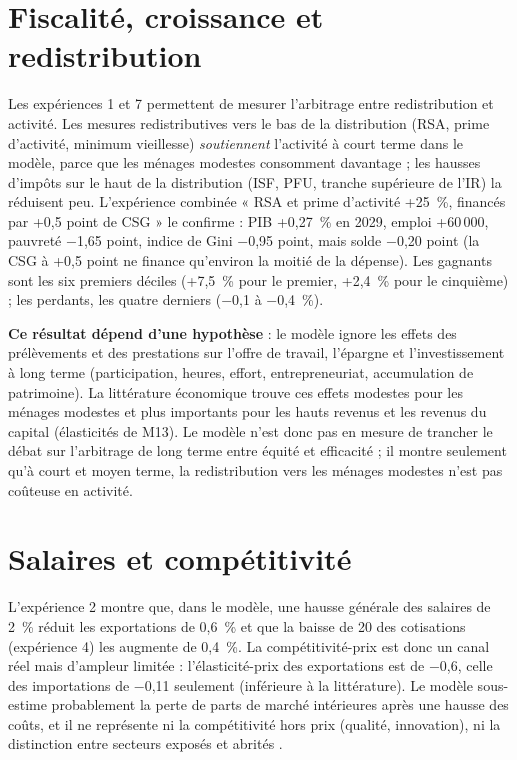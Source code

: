 \section{Fiscalité, croissance et redistribution}

Les expériences 1 et 7 permettent de mesurer l'arbitrage entre redistribution et activité. Les mesures redistributives
vers le bas de la distribution (RSA, prime d'activité, minimum vieillesse) \emph{soutiennent} l'activité à court terme
dans le modèle, parce que les ménages modestes consomment davantage ; les hausses d'impôts sur le haut de la
distribution (ISF, PFU, tranche supérieure de l'IR) la réduisent peu. L'expérience combinée « RSA et prime d'activité
+25~\%, financés par +0,5 point de CSG » le confirme : PIB +0,27~\% en 2029, emploi +60\,000, pauvreté $-$1,65 point,
indice de Gini $-$0,95 point, mais solde $-$0,20 point (la CSG à +0,5 point ne finance qu'environ la moitié de la
dépense). Les gagnants sont les six premiers déciles (+7,5~\% pour le premier, +2,4~\% pour le cinquième) ; les perdants,
les quatre derniers ($-$0,1 à $-$0,4~\%).

\textbf{Ce résultat dépend d'une hypothèse} : le modèle ignore les effets des prélèvements et des prestations sur
l'offre de travail, l'épargne et l'investissement à long terme (participation, heures, effort, entrepreneuriat,
accumulation de patrimoine). La littérature économique trouve ces effets modestes pour les ménages modestes et plus
importants pour les hauts revenus et les revenus du capital (élasticités de M13). Le modèle n'est donc pas en mesure
de trancher le débat sur l'arbitrage de long terme entre équité et efficacité  ; il montre seulement
qu'à court et moyen terme, la redistribution vers les ménages modestes n'est pas coûteuse en activité.

\section{Salaires et compétitivité}

L'expérience 2 montre que, dans le modèle, une hausse générale des salaires de 2~\% réduit les exportations de 0,6~\%
et que la baisse de 20\md{} des cotisations (expérience 4) les augmente de 0,4~\%. La compétitivité-prix est donc un
canal réel mais d'ampleur limitée : l'élasticité-prix des exportations est de $-$0,6, celle des importations de $-$0,11
seulement (inférieure à la littérature). Le modèle sous-estime probablement la perte de parts de marché intérieures
après une hausse des coûts, et il ne représente ni la compétitivité hors prix (qualité, innovation), ni la distinction
entre secteurs exposés et abrités .

